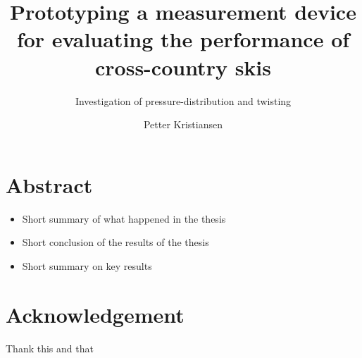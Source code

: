 \documentclass[a4paper,12pt,oneside]{book}
\title{Prototyping a measurement device for evaluating the performance of cross-country skis}
\subtitle{Investigation of pressure-distribution and twisting}
\author{Petter Kristiansen}
\begin{document}
\mnfrontpage
\newpage

\section*{Abstract}
\begin{itemize}
    \item Short summary of what happened in the thesis
    \item Short conclusion of the results of the thesis
    \item Short summary on key results
\end{itemize}

\newpage

\tableofcontents
\listoffigures
\newpage

\section*{Acknowledgement}
Thank this and that

\newpage











%
%
\printbibliography
\begin{appendices}

\end{appendices}
\end{document}
